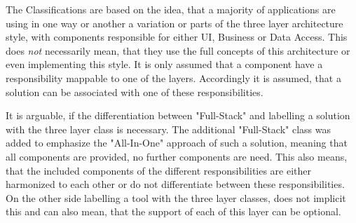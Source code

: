 The Classifications are based on the idea, that a majority of applications are using in one way or another a variation or parts of the three layer architecture style, with components responsible for either UI, Business or Data Access. This does \textit{not} necessarily mean, that they use the full concepts of this architecture or even implementing this style. It is only assumed that a component have a responsibility mappable to one of the layers. Accordingly it is assumed, that a solution can be associated with one of these responsibilities.

It is arguable, if the differentiation between "Full-Stack" and labelling a solution with the three layer class is necessary. The additional "Full-Stack" class was added to emphasize the "All-In-One" approach of such a solution, meaning that all components are provided, no further components are need. This also means, that the included components of the different responsibilities are either harmonized to each other or do not differentiate between these responsibilities. On the other side labelling a tool with the three layer classes, does not implicit this and can also mean, that the support of each of this layer can be optional.